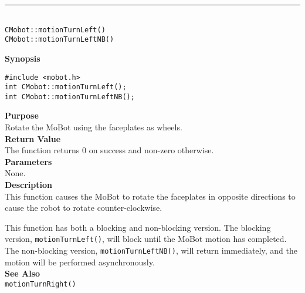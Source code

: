 \noindent
\vspace{5pt}
\rule{4.5in}{0.015in}\\
\noindent
{\LARGE \texttt{CMobot::motionTurnLeft()}}\\
{\LARGE \texttt{CMobot::motionTurnLeftNB()}}\\
{}

\noindent
{\bf Synopsis}\\
\begin{verbatim}
#include <mobot.h>
int CMobot::motionTurnLeft();
int CMobot::motionTurnLeftNB();
\end{verbatim}

\noindent
{\bf Purpose}\\
Rotate the MoBot using the faceplates as wheels.\\

\noindent
{\bf Return Value}\\
The function returns 0 on success and non-zero otherwise.\\

\noindent
{\bf Parameters}\\
None.\\

\noindent
{\bf Description}\\
This function causes the MoBot to rotate the faceplates in opposite directions
to cause the robot to rotate counter-clockwise.

This function has both a blocking and non-blocking version.
The blocking version, \texttt{motionTurnLeft()}, will block until the
MoBot motion has completed. The non-blocking version, \texttt{motionTurnLeftNB()},
will return immediately, and the motion will be performed asynchronously.\\


\noindent
{\bf See Also}\\
\texttt{motionTurnRight()}

